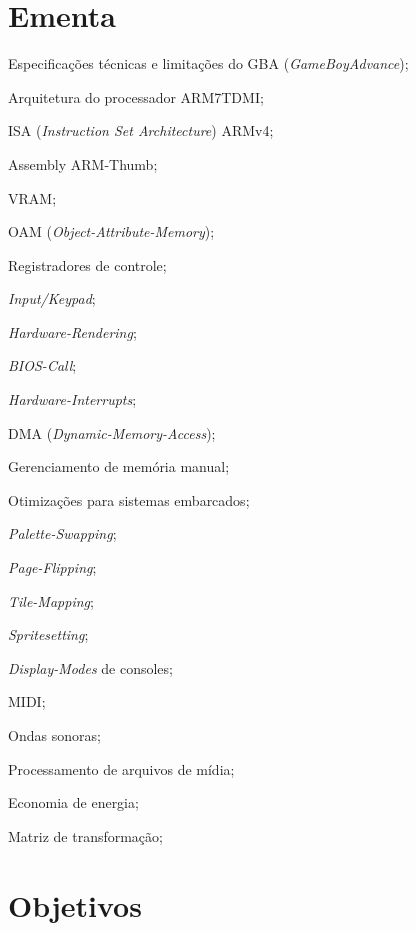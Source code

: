 \documentclass{article}
\begin{document}
\section{Ementa}
\begin{itemize*}[label={}]
    \item Especificações técnicas e limitações do GBA (\textit{GameBoyAdvance}); %
    \item Arquitetura do processador ARM7TDMI\@; %
    \item ISA (\textit{Instruction Set Architecture}) ARMv4; %
    \item Assembly ARM-Thumb; %
    \item VRAM\@; %
    \item OAM (\textit{Object-Attribute-Memory}); %
    \item Registradores de controle; %
    \item \textit{Input/Keypad}; %
    \item \textit{Hardware-Rendering}; %
    \item \textit{BIOS-Call};
    \item \textit{Hardware-Interrupts};
    \item DMA (\textit{Dynamic-Memory-Access});
    \item Gerenciamento de memória manual;
    \item Otimizações para sistemas embarcados;
    \item \textit{Palette-Swapping};
    \item \textit{Page-Flipping}; %
    \item \textit{Tile-Mapping};
    \item \textit{Spritesetting}; %
    \item \textit{Display-Modes} de consoles; %
    \item MIDI\@;
    \item Ondas sonoras;
    \item Processamento de arquivos de mídia;
    \item Economia de energia;
    \item Matriz de transformação;
\end{itemize*}

\section{Objetivos}
\end{document}
